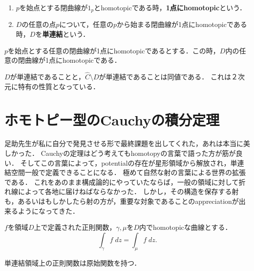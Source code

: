 \documentclass[uplatex, dvipdfmx]{jsreport}
\begin{document}
\begin{definition}\mbox{}
    \begin{enumerate}
        \item $p$を始点とする閉曲線が$1_p$とhomotopicである時，\textbf{1点にhomotopic}という．
        \item $D$の任意の点$p$について，任意の$p$から始まる閉曲線が1点にhomotopicである時，$D$を\textbf{単連結}という．
    \end{enumerate}
\end{definition}

\begin{lemma}
    $p$を始点とする任意の閉曲線が1点にhomotopicであるとする．この時，$D$内の任意の閉曲線が1点にhomotopicである．
\end{lemma}

\begin{proposition}
    $D$が単連結であることと，$\hat{C}\setminus D$が単連結であることは同値である．
    これは２次元に特有の性質となっている．
\end{proposition}

\section{ホモトピー型のCauchyの積分定理}

\begin{screen}
    足助先生が私に自分で発見させる形で最終課題を出してくれた，あれは本当に美しかった．
    Cauchyの定理はどう考えてもhomotopyの言葉で語った方が筋が良い．
    そしてこの言葉によって，potentialの存在が星形領域から解放され，単連結空間一般で定義できることになる．
    極めて自然な射の言葉による世界の拡張である．
    これをあのまま構成論的にやっていたならば，一般の領域に対して折れ線によって各地に届けねばならなかった．
    しかし，その構造を保存する射も，あるいはもしかしたら射の方が，重要な対象であることのappreciationが出来るようになってきた．
\end{screen}

\begin{theorem}\label{thm-Cauchy's-theorem-in-terms-of-homotopy}
    $f$を領域$D$上で定義された正則関数，$\gamma,\mu$を$D$内でhomotopicな曲線とする．
    \[ \int_\gamma f\;dz=\int_\mu f\;dz. \]
\end{theorem}

\begin{theorem}
    単連結領域上の正則関数は原始関数を持つ．
\end{theorem}
\end{document}

